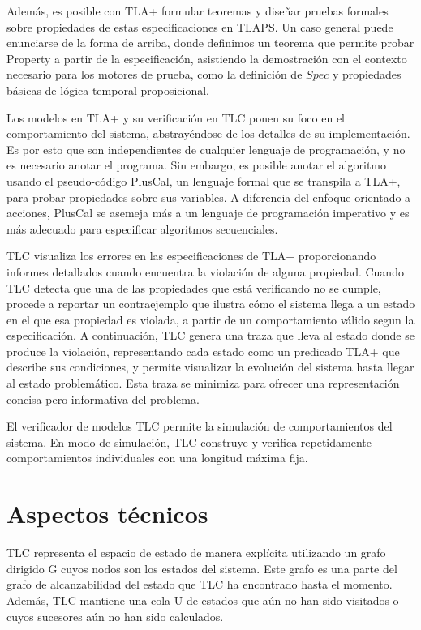 \documentclass[runningheads]{llncs}
\begin{document}
Además, es posible con TLA+ formular teoremas y diseñar pruebas formales sobre propiedades de estas especificaciones en TLAPS. Un caso general puede enunciarse de la forma de arriba, donde definimos un teorema que permite probar Property a partir de la especificación, asistiendo la demostración con el contexto necesario para los motores de prueba, como la definición de $Spec$ y propiedades básicas de lógica temporal proposicional.

Los modelos en TLA+ y su verificación en TLC ponen su foco en el comportamiento del sistema, abstrayéndose de los detalles de su implementación. Es por esto que son independientes de cualquier lenguaje de programación, y no es necesario anotar el programa. Sin embargo, es posible anotar el algoritmo usando el pseudo-código PlusCal, un lenguaje formal que se transpila a TLA+, para probar propiedades sobre sus variables. A diferencia del enfoque orientado a acciones, PlusCal se asemeja más a un lenguaje de programación imperativo y es más adecuado para especificar algoritmos secuenciales.

TLC visualiza los errores en las especificaciones de TLA+ proporcionando informes detallados cuando encuentra la violación de alguna propiedad. Cuando TLC detecta que una de las propiedades que está verificando no se cumple, procede a reportar un contraejemplo que ilustra cómo el sistema llega a un estado en el que esa propiedad es violada, a partir de un comportamiento válido segun la especificación. A continuación, TLC genera una traza que lleva al estado donde se produce la violación, representando cada estado como un predicado TLA+ que describe sus condiciones, y permite visualizar la evolución del sistema hasta llegar al estado problemático. Esta traza se minimiza para ofrecer una representación concisa pero informativa del problema. 

El verificador de modelos TLC permite la simulación de comportamientos del sistema. En modo de simulación, TLC construye y verifica repetidamente comportamientos individuales con una longitud máxima fija.

\section{Aspectos técnicos}
TLC representa el espacio de estado de manera explícita utilizando un grafo dirigido G cuyos nodos son los estados del sistema. Este grafo es una parte del grafo de alcanzabilidad del estado que TLC ha encontrado hasta el momento. Además, TLC mantiene una cola U de estados que aún no han sido visitados o cuyos sucesores aún no han sido calculados.
\end{document}
